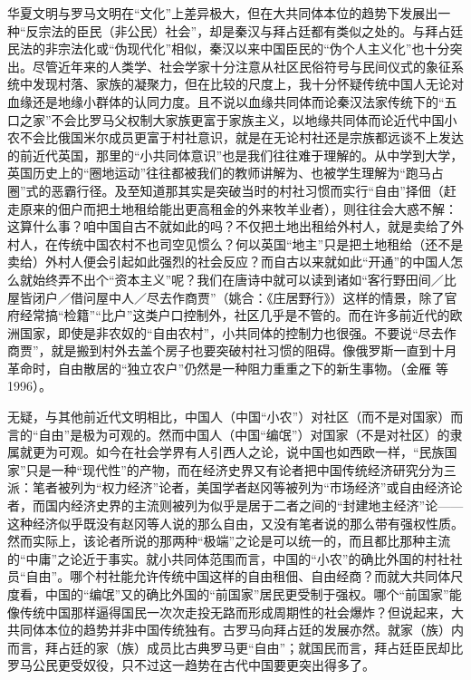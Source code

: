 \documentclass[a4paper,12pt,punct=kaiming,fontset=none]{ctexart}
\begin{document}
华夏文明与罗马文明在“文化”上差异极大，但在大共同体本位的趋势下发展出一种“反宗法的臣民（非公民）社会”，却是秦汉与拜占廷都有类似之处的。与拜占廷民法的非宗法化或“伪现代化”相似，秦汉以来中国臣民的“伪个人主义化”也十分突出。尽管近年来的人类学、社会学家十分注意从社区民俗符号与民间仪式的象征系统中发现村落、家族的凝聚力，但在比较的尺度上，我十分怀疑传统中国人无论对血缘还是地缘小群体的认同力度。且不说以血缘共同体而论秦汉法家传统下的“五口之家”不会比罗马父权制大家族更富于家族主义，以地缘共同体而论近代中国小农不会比俄国米尔成员更富于村社意识，就是在无论村社还是宗族都远谈不上发达的前近代英国，那里的“小共同体意识”也是我们往往难于理解的。从中学到大学，英国历史上的“圈地运动”往往都被我们的教师讲解为、也被学生理解为“跑马占圈”式的恶霸行径。及至知道那其实是突破当时的村社习惯而实行“自由”择佃（赶走原来的佃户而把土地租给能出更高租金的外来牧羊业者），则往往会大惑不解：这算什么事？咱中国自古不就如此的吗？不仅把土地出租给外村人，就是卖给了外村人，在传统中国农村不也司空见惯么？何以英国“地主”只是把土地租给（还不是卖给）外村人便会引起如此强烈的社会反应？而自古以来就如此“开通”的中国人怎么就始终弄不出个“资本主义”呢？我们在唐诗中就可以读到诸如“客行野田间／比屋皆闭户／借问屋中人／尽去作商贾”（姚合：《庄居野行》）这样的情景，除了官府经常搞“检籍”“比户”这类户口控制外，社区几乎是不管的。而在许多前近代的欧洲国家，即使是非农奴的“自由农村”，小共同体的控制力也很强。不要说“尽去作商贾”，就是搬到村外去盖个房子也要突破村社习惯的阻碍。像俄罗斯一直到十月革命时，自由散居的“独立农户”仍然是一种阻力重重之下的新生事物。（金雁 等 1996）。

无疑，与其他前近代文明相比，中国人（中国“小农”）对社区（而不是对国家）而言的“自由”是极为可观的。然而中国人（中国“编氓”）对国家（不是对社区）的隶属就更为可观。如今在社会学界有人引西人之论，说中国也如西欧一样，“民族国家”只是一种“现代性”的产物，而在经济史界又有论者把中国传统经济研究分为三派：笔者被列为“权力经济”论者，美国学者赵冈等被列为“市场经济”或自由经济论者，而国内经济史界的主流则被列为似乎是居于二者之间的“封建地主经济”论——这种经济似乎既没有赵冈等人说的那么自由，又没有笔者说的那么带有强权性质。然而实际上，该论者所说的那两种“极端”之论是可以统一的，而且都比那种主流的“中庸”之论近于事实。就小共同体范围而言，中国的“小农”的确比外国的村社社员“自由”。哪个村社能允许传统中国这样的自由租佃、自由经商？而就大共同体尺度看，中国的“编氓”又的确比外国的“前国家”居民更受制于强权。哪个“前国家”能像传统中国那样逼得国民一次次走投无路而形成周期性的社会爆炸？但说起来，大共同体本位的趋势并非中国传统独有。古罗马向拜占廷的发展亦然。就家（族）内而言，拜占廷的家（族）成员比古典罗马更“自由”；就国民而言，拜占廷臣民却比罗马公民更受奴役，只不过这一趋势在古代中国要更突出得多了。
\end{document}
